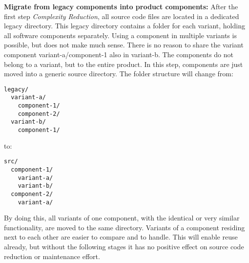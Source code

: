 \textbf{Migrate from legacy components into product components:} After the first step
\textit{Complexity Reduction}, all source code files are located in a dedicated
legacy directory. This legacy directory contains a folder for each variant,
holding all software components separately. Using a component in multiple
variants is possible, but does not make much sense. There is no reason to share
the variant component variant-a/component-1 also in variant-b. The components do
not belong to a variant, but to the entire product. In this step, components are
just moved into a generic source directory. The folder structure will change
from:
\begin{Verbatim}[frame=single,samepage=true]
legacy/
  variant-a/
    component-1/
    component-2/
  variant-b/
    component-1/
\end{Verbatim}
to:
\begin{Verbatim}[frame=single,samepage=true]
src/
  component-1/
    variant-a/
    variant-b/
  component-2/
    variant-a/
\end{Verbatim}
By doing this, all variants of one component, with the identical or very similar
functionality, are moved to the same directory. Variants of a component residing
next to each other are easier to compare and to handle. This will enable reuse
already, but without the following stages it has no positive effect on source
code reduction or maintenance effort.

